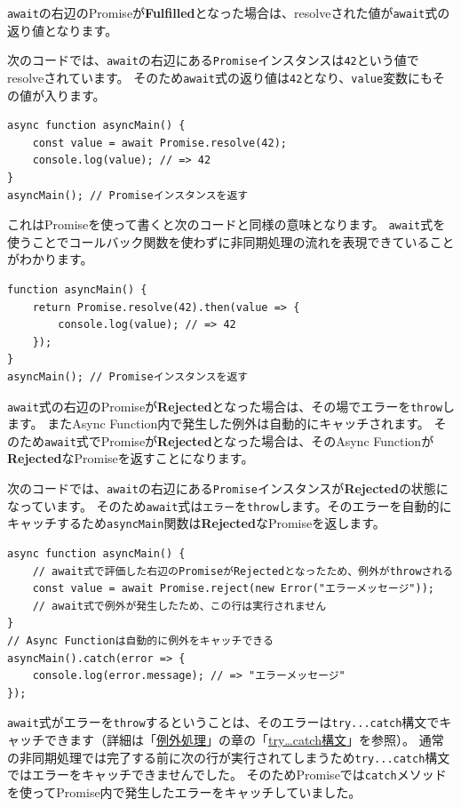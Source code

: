 \texttt{await}の右辺のPromiseが\textbf{Fulfilled}となった場合は、resolveされた値が\texttt{await}式の返り値となります。

次のコードでは、\texttt{await}の右辺にある\texttt{Promise}インスタンスは\texttt{42}という値でresolveされています。
そのため\texttt{await}式の返り値は\texttt{42}となり、\texttt{value}変数にもその値が入ります。

\begin{lstlisting}
async function asyncMain() {
    const value = await Promise.resolve(42);
    console.log(value); // => 42
}
asyncMain(); // Promiseインスタンスを返す
\end{lstlisting}

これはPromiseを使って書くと次のコードと同様の意味となります。
\texttt{await}式を使うことでコールバック関数を使わずに非同期処理の流れを表現できていることがわかります。

\begin{lstlisting}
function asyncMain() {
    return Promise.resolve(42).then(value => {
        console.log(value); // => 42
    });
}
asyncMain(); // Promiseインスタンスを返す
\end{lstlisting}

\texttt{await}式の右辺のPromiseが\textbf{Rejected}となった場合は、その場でエラーを\texttt{throw}します。
またAsync Function内で発生した例外は自動的にキャッチされます。
そのため\texttt{await}式でPromiseが\textbf{Rejected}となった場合は、そのAsync
Functionが\textbf{Rejected}なPromiseを返すことになります。

次のコードでは、\texttt{await}の右辺にある\texttt{Promise}インスタンスが\textbf{Rejected}の状態になっています。
そのため\texttt{await}式は\texttt{エラー}を\texttt{throw}します。そのエラーを自動的にキャッチするため\texttt{asyncMain}関数は\textbf{Rejected}なPromiseを返します。

\begin{lstlisting}
async function asyncMain() {
    // await式で評価した右辺のPromiseがRejectedとなったため、例外がthrowされる
    const value = await Promise.reject(new Error("エラーメッセージ"));
    // await式で例外が発生したため、この行は実行されません
}
// Async Functionは自動的に例外をキャッチできる
asyncMain().catch(error => {
    console.log(error.message); // => "エラーメッセージ"
});
\end{lstlisting}

\texttt{await}式がエラーを\texttt{throw}するということは、そのエラーは\texttt{try...catch}構文でキャッチできます（詳細は「\hyperlink{error-handling}{例外処理}」の章の「\hyperlink{try-catch}{try\ldots{}catch構文}」を参照）。
通常の非同期処理では完了する前に次の行が実行されてしまうため\texttt{try...catch}構文ではエラーをキャッチできませんでした。
そのためPromiseでは\texttt{catch}メソッドを使ってPromise内で発生したエラーをキャッチしていました。

